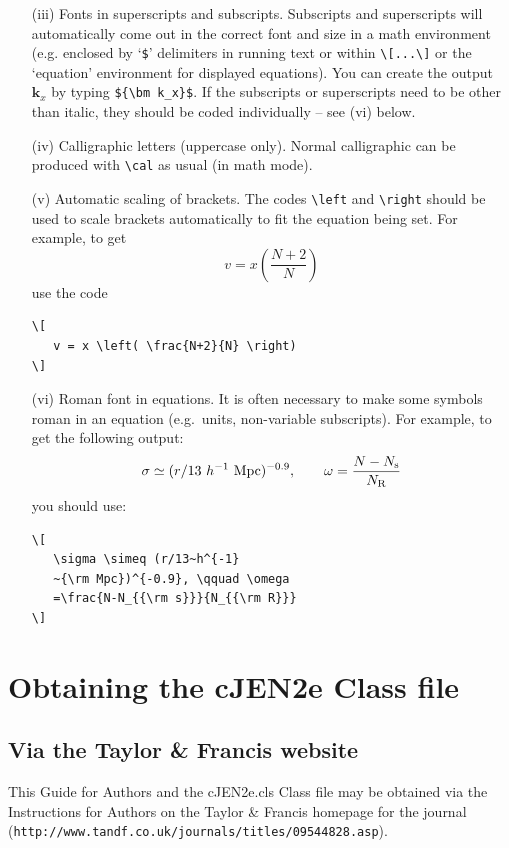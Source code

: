 \documentclass[]{cJEN2e}
\begin{document}
\begin{enumerate}
\item[(iii)] Fonts in superscripts and subscripts. Subscripts and superscripts will automatically come  out in the correct font
and size in a math environment (e.g. enclosed by `\verb"$"'
delimiters in running text or within \verb"\[...\]" or the
`equation' environment for displayed equations). You can create
the output ${\bm k_x}$ by typing \verb"${\bm k_x}$". If the
subscripts or superscripts need to be other than italic, they
should be coded individually -- see (vi) below.

\item[(iv)] Calligraphic letters (uppercase only).
%
%
Normal calligraphic can be produced with \verb"\cal" as usual (in
math mode).

\item[(v)] Automatic scaling of brackets. The codes \verb"\left" and
\verb"\right" should  be used to scale brackets automatically to
fit the equation being set. For example, to get
\[
   v = x \left( \frac{N+2}{N} \right)
\]
use the code
%
\begin{verbatim}
\[
   v = x \left( \frac{N+2}{N} \right)
\]
\end{verbatim}

\item[(vi)] Roman font in equations. It is often necessary to make some
symbols roman in an equation (e.g.\ units, non-variable
subscripts). For example, to get the following output:
\[
   \sigma \simeq (r/13~h^{-1}~{\rm Mpc})^{-0.9},
   \qquad \omega = \frac{N-N_{\rm s}}{N_{\rm R}}
\]
\noindent you should use:
%
\begin{verbatim}
\[
   \sigma \simeq (r/13~h^{-1}
   ~{\rm Mpc})^{-0.9}, \qquad \omega
   =\frac{N-N_{{\rm s}}}{N_{{\rm R}}}
\]
\end{verbatim}
\end{enumerate}

\section{Obtaining the cJEN2e Class file}\label{FTP}

\subsection{Via the Taylor \& Francis website}

\noindent This Guide for Authors and the cJEN2e.cls Class file may be obtained via the Instructions for Authors
on the Taylor \& Francis homepage for the journal ({\tt{http://www.tandf.co.uk/journals/titles/09544828.asp}}).
\end{document}
